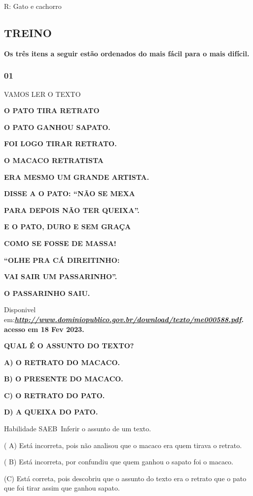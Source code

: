 R: Gato e cachorro

\subsection{TREINO}\label{treino-4}

\textbf{Os três itens a seguir estão ordenados do mais fácil para o mais
difícil. }

\subsubsection{01 }\label{section-16}

VAMOS LER O TEXTO

\textbf{O PATO TIRA RETRATO}

\textbf{O PATO GANHOU SAPATO.}

\textbf{FOI LOGO TIRAR RETRATO.}

\textbf{O MACACO RETRATISTA}

\textbf{ERA MESMO UM GRANDE ARTISTA.}

\textbf{DISSE A O PATO: ``NÃO SE MEXA}

\textbf{PARA DEPOIS NÃO TER QUEIXA''.}

\textbf{E O PATO, DURO E SEM GRAÇA}

\textbf{COMO SE FOSSE DE MASSA!}

\textbf{``OLHE PRA CÁ DIREITINHO:}

\textbf{VAI SAIR UM PASSARINHO''.}

\textbf{O PASSARINHO SAIU.}

Disponivel
em:\textbf{\href{http://www.dominiopublico.gov.br/download/texto/me000588.pdf}{\emph{http://www.dominiopublico.gov.br/download/texto/me000588.pdf}}.
acesso em 18 Fev 2023.}

\textbf{QUAL É O ASSUNTO DO TEXTO?}

\textbf{A) O RETRATO DO MACACO.}

\textbf{B) O PRESENTE DO MACACO.}

\textbf{C) O RETRATO DO PATO.}

\textbf{D) A QUEIXA DO PATO.}

Habilidade SAEB~Inferir o assunto de um texto.

( A) Está incorreta, pois não analisou que o macaco era quem tirava o
retrato.

( B) Está incorreta, por confundiu que quem ganhou o sapato foi o
macaco.

(C) Está correta, pois descobriu que o assunto do texto era o retrato
que o pato que foi tirar assim que ganhou sapato.


